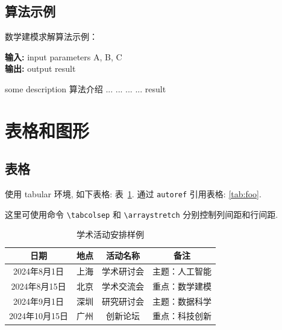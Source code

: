 \documentclass[bwprint]{gmcmthesis}
\begin{document}
\subsection{算法示例}

数学建模求解算法示例：
\begin{center}
\begin{minipage}{0.8\textwidth}
\begin{algorithm}[H]%
\caption{算法的名字} %
{\bf 输入:} %
input parameters A, B, C\\
{\bf 输出:} %
output result
\begin{algorithmic}[1]
\State some description 算法介绍 %
  \State ...
    \State ...
  \Else
    \State ...
  \EndIf
\EndFor
{} %
  \State ...
\EndWhile
\State \Return result
\end{algorithmic}
\end{algorithm}
\end{minipage}
\end{center}
\vspace{2ex}

\section{表格和图形}

\subsection{表格}

使用 tabular 环境, 如下表格: 表~\ref{tab:foo}. 通过 \verb|autoref| 引用表格: \autoref{tab:foo}.

这里可使用命令 \verb|\tabcolsep| 和 \verb|\arraystretch| 分别控制列间距和行间距.

\begin{table}[htp!]
\centering
\setlength{\tabcolsep}{12pt}  %
\renewcommand{\arraystretch}{1.2}
\caption{学术活动安排样例}
\label{tab:foo}
\begin{tabular}{|c|c|c|c|}
\hline
\textbf{日期}  & \textbf{地点} & \textbf{活动名称} & \textbf{备注} \\ \hline
2024年8月1日      & 上海       & 学术研讨会      & 主题：人工智能 \\ \hline
2024年8月15日    & 北京       & 学术交流会      & 重点：数学建模 \\ \hline
2024年9月1日      & 深圳       & 研究研讨会      & 主题：数据科学 \\ \hline
2024年10月15日  & 广州       & 创新论坛         & 重点：科技创新 \\ \hline
\end{tabular}
\end{table}
\end{document}
